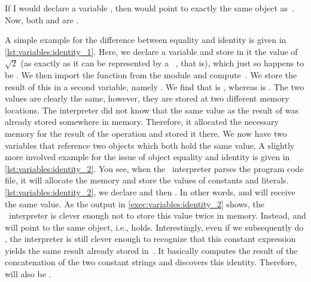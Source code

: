 If I would declare a variable , then  would point to exactly the same  object as~.
Now, both  and  are .

A simple example for the difference between equality and identity is given in \cref{lst:variables:identity_1}.
Here, we declare a  variable and store in it the value of~$\sqrt{2}$ (as exactly as it can be represented by a \python\ , that is), which just so happens to be .
We then import the function  from the  module and compute~.
We store the result of this in a second variable, namely .
We find that  is , whereas  is .
The two values are clearly the same, however, they are stored at two different memory locations.
The interpreter did not know that the same value as the result of  was already stored somewhere in memory.
Therefore, it allocated the necessary memory for the result of the  operation and stored it there.
We now have two variables that reference two objects which both hold the same value.%
%
%
%
A slightly more involved example for the issue of object equality and identity is given in \cref{lst:variables:identity_2}.
You see, when the \python\ interpreter parses the program code file, it will allocate the memory and store the values of constants and literals.
\cref{lst:variables:identity_2}, we declare  and then .
In other words,  and  will receive the same value.
As the output in \cref{exec:variables:identity_2} shows, the \python\ interpreter is clever enough not to store this value twice in memory.
Instead,  and  will point to the same object, i.e.,  holds.
Interestingly, even if we subsequently do , the interpreter is still clever enough to recognize that this constant expression yields the same result already stored in~.
It basically computes the result of the concatenation of the two constant strings and discovers this identity.
Therefore,  will also be .

